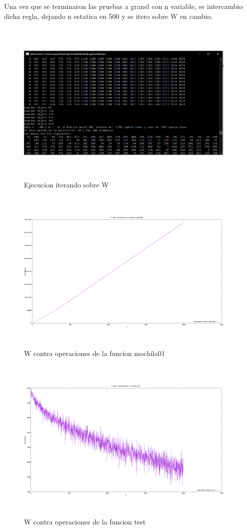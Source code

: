 \documentclass[spanish]{article}
\begin{document}
	Una vez que se terminaron las pruebas a granel con n variable, se intercambio dicha regla, dejando n estatica en 500 y se itero sobre W en cambio.\\
	\begin{figure}[H]
		\centering
		\includegraphics[width=400px,height=300px]{captura3}
		\caption{Ejecucion iterando sobre W}
	\end{figure}
	\begin{figure}[H]
		\centering
		\includegraphics[width=400px,height=300px]{grafica8}
		\caption{W contra operaciones de la funcion mochila01}
	\end{figure}
	\begin{figure}[H]
		\centering
		\includegraphics[width=400px,height=300px]{grafica9}
		\caption{W contra operaciones de la funcion test}
	\end{figure}
\end{document}
